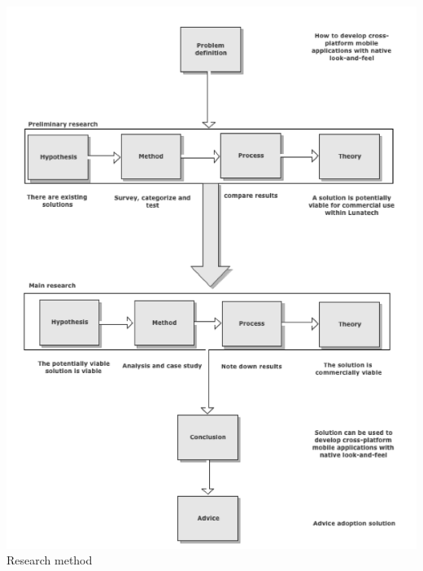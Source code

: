 \newpage
\begin{centering}
\includegraphics[scale=0.6]{images/researchprocess.png}\\{Research method}\\
\end{centering}


